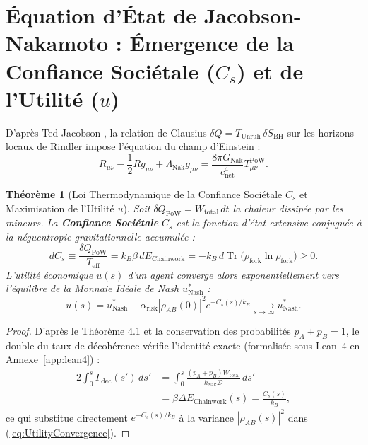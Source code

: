 \documentclass[10pt,twocolumn,a4paper]{article}
\theoremstyle{plain}
\newtheorem{theorem}{Théorème}[section]
\theoremstyle{definition}
\theoremstyle{remark}
\newcommand{\kNak}{k_{\text{Nak}}}
\newcommand{\GNak}{G_{\text{Nak}}}
\newcommand{\LambdaNak}{\Lambda_{\text{Nak}}}
\newcommand{\Tr}{\operatorname{Tr}}
\begin{document}
\section{Équation d'État de Jacobson-Nakamoto : Émergence de la Confiance Sociétale ($C_s$) et de l'Utilité ($u$)}

D'après Ted Jacobson \cite{Jacobson1995}, la relation de Clausius $\delta Q = T_{\text{Unruh}} \, \delta S_{\text{BH}}$ sur les horizons locaux de Rindler impose l'équation du champ d'Einstein :
\begin{equation}
    R_{\mu\nu} - \frac{1}{2} R g_{\mu\nu} + \LambdaNak g_{\mu\nu} = \frac{8\pi \GNak}{c_{\text{net}}^4} T_{\mu\nu}^{\text{PoW}}.
    \label{eq:EinsteinNakamoto}
\end{equation}

\begin{theorem}[Loi Thermodynamique de la Confiance Sociétale $C_s$ et Maximisation de l'Utilité $u$]
Soit $\delta Q_{\text{PoW}} = W_{\text{total}} \, dt$ la chaleur dissipée par les mineurs. La \textbf{Confiance Sociétale} $C_s$ est la fonction d'état extensive conjuguée à la néguentropie gravitationnelle accumulée :
\begin{equation}
    dC_s \equiv \frac{\delta Q_{\text{PoW}}}{T_{\text{eff}}} = k_B \beta \, dE_{\text{Chainwork}} = -k_B \, d\Tr\big(\rho_{\text{fork}} \ln \rho_{\text{fork}}\big) \ge 0.
    \label{eq:SocietalTrustLaw}
\end{equation}
L'utilité économique $u(s)$ d'un agent converge alors exponentiellement vers l'équilibre de la \textit{Monnaie Idéale} de Nash $u_{\text{Nash}}^*$ \cite{Nash2002} :
\begin{equation}
    u(s) = u_{\text{Nash}}^* - \alpha_{\text{risk}} |\rho_{AB}(0)|^2 e^{-C_s(s)/k_B} \underset{s \to \infty}{\longrightarrow} u_{\text{Nash}}^*.
    \label{eq:UtilityConvergence}
\end{equation}
\end{theorem}

\begin{proof}
D'après le Théorème 4.1 et la conservation des probabilités $p_A + p_B = 1$, le double du taux de décohérence vérifie l'identité exacte (formalisée sous Lean~4 en Annexe~\ref{app:lean4}) :
\begin{equation}
\begin{split}
    2 \int_0^s \Gamma_{\text{dec}}(s') \, ds' &= \int_0^s \frac{(p_A + p_B) W_{\text{total}}}{\kNak \mathcal{D}} \, ds' \\
    &= \beta \Delta E_{\text{Chainwork}}(s) = \frac{C_s(s)}{k_B},
\end{split}
\end{equation}
ce qui substitue directement $e^{-C_s(s)/k_B}$ à la variance $|\rho_{AB}(s)|^2$ dans (\ref{eq:UtilityConvergence}).
\end{proof}
\end{document}
